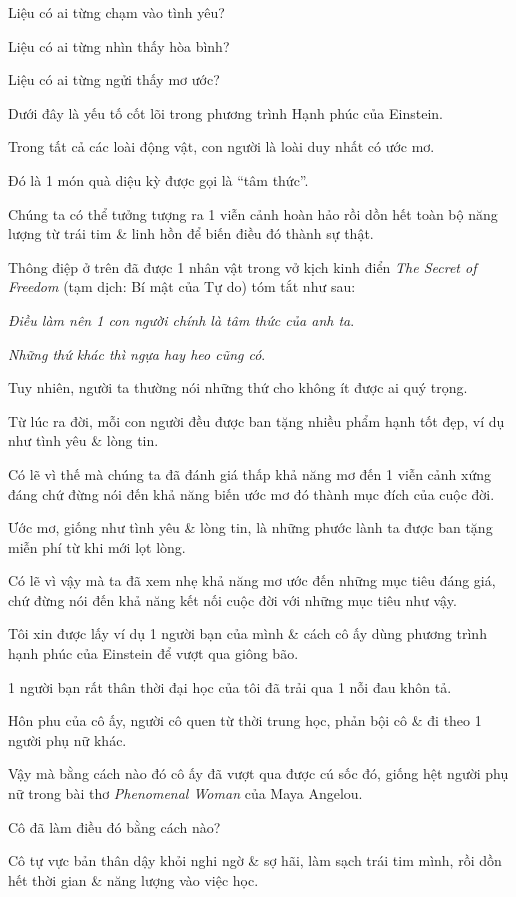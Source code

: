 \documentclass{article}
\begin{document}
Liệu có ai từng chạm vào tình yêu?

Liệu có ai từng nhìn thấy hòa bình?

Liệu có ai từng ngửi thấy mơ ước?

Dưới đây là yếu tố cốt lõi trong phương trình Hạnh phúc của Einstein.

%
Trong tất cả các loài động vật, con người là loài duy nhất có ước mơ.

Đó là 1 món quà diệu kỳ được gọi là ``tâm thức''.

Chúng ta có thể tưởng tượng ra 1 viễn cảnh hoàn hảo rồi dồn hết toàn bộ năng lượng từ trái tim \& linh hồn để biến điều đó thành sự thật.

%
Thông điệp ở trên đã được 1 nhân vật trong vở kịch kinh điển \textit{The Secret of Freedom} (tạm dịch: Bí mật của Tự do) tóm tắt như sau:

%
\textit{Điều làm nên 1 con người chính là tâm thức của anh ta}.

\textit{Những thứ khác thì ngựa hay heo cũng có}.

%
Tuy nhiên, người ta thường nói những thứ cho không ít được ai quý trọng.

%
Từ lúc ra đời, mỗi con người đều được ban tặng nhiều phẩm hạnh tốt đẹp, ví dụ như tình yêu \& lòng tin.

Có lẽ vì thế mà chúng ta đã đánh giá thấp khả năng mơ đến 1 viễn cảnh xứng đáng chứ đừng nói đến khả năng biến ước mơ đó thành mục đích của cuộc đời.

Ước mơ, giống như tình yêu \& lòng tin, là những phước lành ta được ban tặng miễn phí từ khi mới lọt lòng.

Có lẽ vì vậy mà ta đã xem nhẹ khả năng mơ ước đến những mục tiêu đáng giá, chứ đừng nói đến khả năng kết nối cuộc đời với những mục tiêu như vậy.

%
Tôi xin được lấy ví dụ 1 người bạn của mình \& cách cô ấy dùng phương trình hạnh phúc của Einstein để vượt qua giông bão.

%
1 người bạn rất thân thời đại học của tôi đã trải qua 1 nỗi đau khôn tả.

Hôn phu của cô ấy, người cô quen từ thời trung học, phản bội cô \& đi theo 1 người phụ nữ khác.

Vậy mà bằng cách nào đó cô ấy đã vượt qua được cú sốc đó, giống hệt người phụ nữ trong bài thơ \textit{Phenomenal Woman} của Maya Angelou.

%
Cô đã làm điều đó bằng cách nào?

%
Cô tự vực bản thân dậy khỏi nghi ngờ \& sợ hãi, làm sạch trái tim  mình, rồi dồn hết thời gian \& năng lượng vào việc học.
\end{document}
